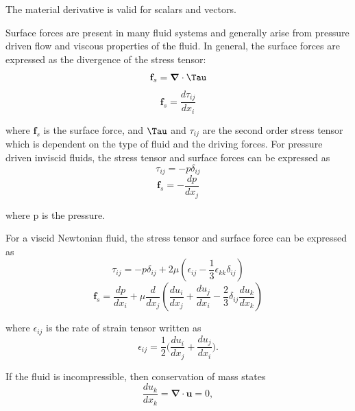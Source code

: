 \noindent The material derivative is valid for scalars and vectors.

\par Surface forces are present in many fluid systems and generally arise from pressure driven flow and viscous properties of the fluid. In general, the surface forces are expressed as the divergence of the stress tensor:
\begin{equation}
    \textbf{f}_s = \boldsymbol{\nabla} \cdot \Tau
\end{equation}
\begin{equation}
    \textbf{f}_s = \frac{d\tau_{ij}}{dx_i}
\end{equation}

\noindent where $\textbf{f}_s$ is the surface force, and $\Tau$ and $\tau_{ij}$ are the second order stress tensor which is dependent on the type of fluid and the driving forces. For pressure driven inviscid fluids, the stress tensor and surface forces can be expressed as 
\begin{equation}
    \tau_{ij} = -p\delta_{ij}
\end{equation}
\begin{equation}
    \textbf{f}_s = - \frac{dp}{dx_j}
\end{equation}

\noindent where p is the pressure. 

\par For a viscid Newtonian fluid, the stress tensor and surface force can be expressed as \cite{probstein_physicochemical_2005}
\begin{equation}
    \tau_{ij} = -p\delta_{ij} + 2\mu(\epsilon_{ij} - \frac{1}{3}\epsilon_{kk}\delta_{ij})
\end{equation}
\begin{equation}
    \textbf{f}_s = \frac{dp}{dx_i} + \mu \frac{d}{dx_j}(\frac{du_i}{dx_j} + \frac{du_j}{dx_i} - \frac{2}{3}\delta_{ij}\frac{du_k}{dx_k})
    \label{eqn:viscid_newt_force}
\end{equation}

\noindent where $\epsilon_{ij}$ is the rate of strain tensor written as 
\begin{equation}
    \epsilon_{ij} = \frac{1}{2} \Big(\frac{du_i}{dx_j} + \frac{du_j}{dx_i}\Big).
\end{equation}

\noindent If the fluid is incompressible, then conservation of mass states
\begin{equation}
    \frac{du_k}{dx_k} = \boldsymbol{\nabla} \cdot \textbf{u} = 0,
    \label{eqn:incompressible_cons_mass}
\end{equation}

